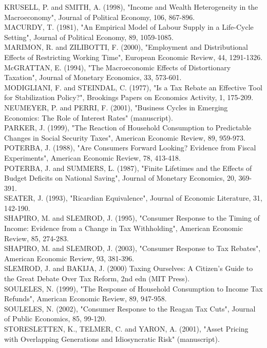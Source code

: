 \documentclass[11pt]{article}
\begin{document}
KRUSELL, P. and SMITH, A. (1998), "Income and Wealth Heterogeneity in the Macroeconomy", Journal of Political Economy, 106, 867-896.\\
MACURDY, T. (1981), "An Empirical Model of Labour Supply in a Life-Cycle Setting", Journal of Political Economy, 89, 1059-1085.\\
MARIMON, R. and ZILIBOTTI, F. (2000), "Employment and Distributional Effects of Restricting Working Time", European Economic Review, 44, 1291-1326.\\
McGRATTAN, E. (1994), "The Macroeconomic Effects of Distortionary Taxation", Journal of Monetary Economics, 33, 573-601.\\
MODIGLIANI, F. and STEINDAL, C. (1977), "Is a Tax Rebate an Effective Tool for Stabilization Policy?", Brookings Papers on Economics Activity, 1, 175-209.\\
NEUMEYER, P. and PERRI, F. (2001), "Business Cycles in Emerging Economics: The Role of Interest Rates" (manuscript).\\
PARKER, J. (1999), "The Reaction of Household Consumption to Predictable Changes in Social Security Taxes", American Economic Review, 89, 959-973.\\
POTERBA, J. (1988), "Are Consumers Forward Looking? Evidence from Fiscal Experiments", American Economic Review, 78, 413-418.\\
POTERBA, J. and SUMMERS, L. (1987), "Finite Lifetimes and the Effects of Budget Deficits on National Saving", Journal of Monetary Economics, 20, 369-391.\\
SEATER, J. (1993), "Ricardian Equivalence", Journal of Economic Literature, 31, 142-190.\\
SHAPIRO, M. and SLEMROD, J. (1995), "Consumer Response to the Timing of Income: Evidence from a Change in Tax Withholding", American Economic Review, 85, 274-283.\\
SHAPIRO, M. and SLEMROD, J. (2003), "Consumer Response to Tax Rebates", American Economic Review, 93, 381-396.\\
SLEMROD, J. and BAKIJA, J. (2000) Taxing Ourselves: A Citizen's Guide to the Great Debate Over Tax Reform, 2nd edn (MIT Press).\\
SOULELES, N. (1999), "The Response of Household Consumption to Income Tax Refunds", American Economic Review, 89, 947-958.\\
SOULELES, N. (2002), "Consumer Response to the Reagan Tax Cuts", Journal of Public Economics, 85, 99-120.\\
STORESLETTEN, K., TELMER, C. and YARON, A. (2001), "Asset Pricing with Overlapping Generations and Idiosyncratic Risk" (manuscript).\\
\end{document}
